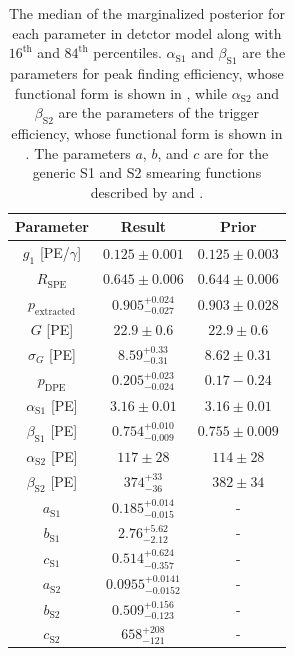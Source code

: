 \begin{table}[t]
\centering
\def\arraystretch{1.3}
\begin{tabular}{c|cc}
Parameter & Result & Prior \\
\hline
$g_1$ [PE/$\gamma$] & $0.125 \pm 0.001$ & $0.125 \pm 0.003$  \\
$R_{\textrm{SPE}}$ & $0.645 \pm 0.006$ & $0.644 \pm 0.006$ \\
$p_{\textrm{extracted}}$ & $0.905^{+0.024}_{-0.027}$ & $0.903 \pm 0.028$ \\
$G$ [PE] & $22.9 \pm 0.6$ & $22.9 \pm 0.6$  \\
$\sigma_G$ [PE] & $8.59^{+0.33}_{-0.31}$ & $8.62 \pm 0.31$  \\
$p_{\textrm{DPE}}$ & $0.205^{+0.023}_{-0.024}$ & $0.17 - 0.24$ \\

$\alpha_{\textrm{S1}}$ [PE] & $3.16 \pm 0.01$ & $3.16 \pm 0.01$ \\
$\beta_{\textrm{S1}}$ [PE] & $0.754^{+0.010}_{-0.009}$ & $0.755 \pm 0.009$ \\

$\alpha_{\textrm{S2}}$ [PE] & $117 \pm 28$ & $114 \pm 28$ \\
$\beta_{\textrm{S2}}$ [PE] & $374^{+33}_{-36}$ & $382 \pm 34$ \\

$a_{\textrm{S1}}$ & $0.185^{+0.014}_{-0.015}$ & - \\
$b_{\textrm{S1}}$ & $2.76^{+5.62}_{-2.12}$ & - \\
$c_{\textrm{S1}}$ & $0.514^{+0.624}_{-0.357}$ & - \\

$a_{\textrm{S2}}$ & $0.0955^{+0.0141}_{-0.0152}$ & - \\
$b_{\textrm{S2}}$ & $0.509^{+0.156}_{-0.123}$ & - \\
$c_{\textrm{S2}}$ & $658^{+208}_{-121}$ & - \\

\end{tabular}
\caption{The median of the marginalized posterior for each parameter in detctor model along with $16^{\textrm{th}}$ and $84^{\textrm{th}}$ percentiles.  $\alpha_{\textrm{S1}}$ and $\beta_{\textrm{S1}}$ are the parameters for peak finding efficiency, whose functional form is shown in , while $\alpha_{\textrm{S2}}$ and $\beta_{\textrm{S2}}$ are the parameters of the trigger efficiency, whose functional form is shown in .  The parameters $a$, $b$, and $c$ are for the generic S1 and S2 smearing functions described by  and .}
\label{tab:nerix_detector_model}
\end{table}



